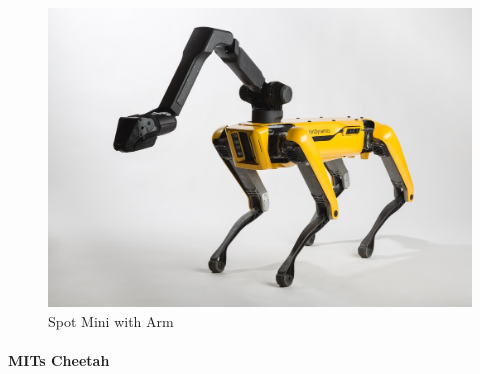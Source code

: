 \begin{figure}[H]
        \centering
        \includegraphics[width=120mm]{figures/SpotMiniwithArm.jpg}
        \caption{Spot Mini with Arm}
        \label{fig:my_label}
    \end{figure}

    \paragraph{MITs Cheetah}

